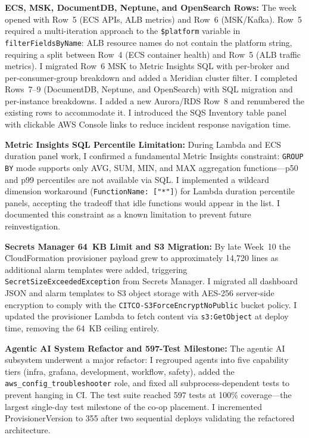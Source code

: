 \textbf{ECS, MSK, DocumentDB, Neptune, and OpenSearch Rows:} 
The week opened with Row~5 (ECS APIs, ALB metrics) and Row~6 (MSK/Kafka).
Row~5 required a multi-iteration approach to the \texttt{\$platform}
variable in \texttt{filterFieldsByName}: ALB resource names do not contain
the platform string, requiring a split between Row~4 (ECS container health)
and Row~5 (ALB traffic metrics). I migrated Row~6 MSK to Metric Insights
SQL with per-broker and per-consumer-group breakdown and added a Meridian cluster
filter. I completed Rows~7--9 (DocumentDB, Neptune, and OpenSearch)
with SQL migration and per-instance breakdowns. I added a new Aurora/RDS
Row~8 and renumbered the existing rows to accommodate it. I introduced the SQS
Inventory table panel with clickable AWS Console links to reduce incident response navigation time.

\textbf{Metric Insights SQL Percentile Limitation:} 
During Lambda and ECS
duration panel work, I confirmed a fundamental Metric Insights constraint:
\texttt{GROUP BY} mode supports only AVG, SUM, MIN, and MAX aggregation
functions---p50 and p99 percentiles are not available via SQL. I implemented
a wildcard dimension workaround (\texttt{FunctionName:~["*"]}) for Lambda
duration percentile panels, accepting the tradeoff that idle functions
would appear in the list. I documented this constraint as a known
limitation to prevent future reinvestigation.

\textbf{Secrets Manager 64~KB Limit and S3 Migration:} 
By late
Week~10 the CloudFormation provisioner payload grew to approximately
14,720 lines as additional alarm templates were added, triggering
\texttt{SecretSizeExceededException} from Secrets Manager. I migrated
all dashboard JSON and alarm templates to S3 object storage with
AES-256 server-side encryption to comply with the
\texttt{CITCO-S3ForceEncryptNoPublic} bucket policy. I updated the provisioner
Lambda to fetch content via \texttt{s3:GetObject} at
deploy time, removing the 64~KB ceiling entirely.

\textbf{Agentic AI System Refactor and 597-Test Milestone:} 
The agentic AI subsystem underwent a major refactor:
I regrouped agents into five capability tiers (infra, grafana,
development, workflow, safety), added the \texttt{aws\_config\_troubleshooter}
role, and fixed all subprocess-dependent tests to prevent
hanging in CI. The test suite reached 597 tests at 100\%
coverage---the largest single-day test milestone of the
co-op placement. I incremented ProvisionerVersion to 355 after two
sequential deploys validating the refactored architecture.

